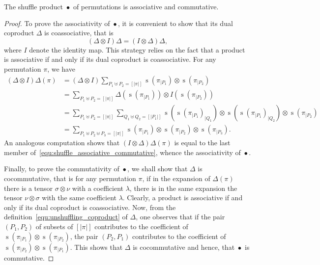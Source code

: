 \documentclass[a4paper,10pt]{llncs}
\DeclareMathOperator{\STD}{\mathrm{s}}
\DeclareMathOperator{\SHUFFLE}{\bullet}
\begin{document}
\begin{proposition} \label{prop:shuffle_associative_commutative}
    The shuffle product $\SHUFFLE$ of permutations is associative and
    commutative.
\end{proposition}
\begin{proof}
    To prove the associativity of $\SHUFFLE$, it is convenient to show
    that its dual coproduct $\Delta$ is coassociative, that is
    \begin{equation}
        (\Delta \otimes I) \Delta = (I \otimes \Delta) \Delta,
    \end{equation}
    where $I$ denote the identity map. This strategy relies on the fact
    that a product is associative if and only if its dual coproduct is
    coassociative. For any permutation $\pi$, we have
    \begin{equation} \begin{split}
    \label{equ:shuffle_associative_commutative}
        (\Delta \otimes I) \Delta(\pi) & =
        (\Delta \otimes I)
        \sum_{P_1 \uplus P_2 = [|\pi|]}
        \STD\left(\pi_{|P_1}\right) \otimes \STD\left(\pi_{|P_2}\right) \\
        & =
        \sum_{P_1 \uplus P_2 = [|\pi|]}
        \Delta\left(\STD\left(\pi_{|P_1}\right)\right)
        \otimes I\left(\STD\left(\pi_{|P_2}\right)\right) \\
        & =
        \sum_{P_1 \uplus P_2 = [|\pi|]}
        \sum_{Q_1 \uplus Q_2 = [|P_1|]}
        \STD\left(\STD\left(\pi_{|P_1}\right)_{|Q_1}\right)
        \otimes
        \STD\left(\STD\left(\pi_{|P_1}\right)_{|Q_2}\right)
        \otimes \STD\left(\pi_{|P_2}\right) \\
        & =
        \sum_{P_1 \uplus P_2 \uplus P_3 = [|\pi|]}
        \STD\left(\pi_{|P_1}\right) \otimes
        \STD\left(\pi_{|P_2}\right) \otimes
        \STD\left(\pi_{|P_3}\right).
    \end{split} \end{equation}
    An analogous computation shows that $(I \otimes \Delta) \Delta(\pi)$
    is equal to the last member
    of~\eqref{equ:shuffle_associative_commutative}, whence the
    associativity of $\SHUFFLE$.
    \smallskip

    Finally, to prove the commutativity of $\SHUFFLE$, we shall show
    that $\Delta$ is cocommutative, that is for any permutation $\pi$,
    if in the expansion of $\Delta(\pi)$ there is a tensor
    $\sigma \otimes \nu$ with a coefficient $\lambda$, there is in the
    same expansion the tensor $\nu \otimes \sigma$ with the same
    coefficient $\lambda$. Clearly, a product is associative if and only
    if its dual coproduct is coassociative. Now, from the
    definition~\eqref{equ:unshuffling_coproduct} of $\Delta$, one
    observes that if the pair $(P_1, P_2)$ of subsets of $[|\pi|]$
    contributes to the coefficient of
    $\STD\left(\pi_{|P_1}\right) \otimes \STD\left(\pi_{|P_2}\right)$,
    the pair $(P_2, P_1)$ contributes to the coefficient of
    $\STD\left(\pi_{|P_2}\right) \otimes \STD\left(\pi_{|P_1}\right)$.
    This shows that $\Delta$ is cocommutative and hence, that $\SHUFFLE$
    is commutative.
\end{proof}
\medskip
\end{document}
